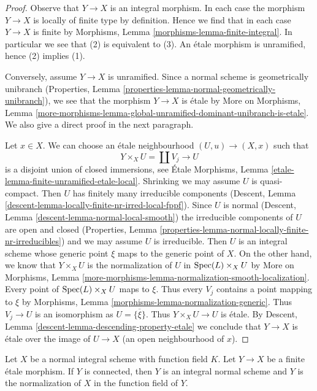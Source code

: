 \begin{proof}
Observe that $Y \to X$ is an integral morphism.
In each case the morphism $Y \to X$ is locally of finite type
by definition.
Hence we find that in each case $Y \to X$ is finite by
Morphisms, Lemma \ref{morphisms-lemma-finite-integral}.
In particular we see that (2) is equivalent to (3).
An \'etale morphism is unramified, hence (2) implies (1).

\medskip\noindent
Conversely, assume $Y \to X$ is unramified. Since a normal scheme is
geometrically unibranch
(Properties, Lemma \ref{properties-lemma-normal-geometrically-unibranch}),
we see that the morphism $Y \to X$ is \'etale by More on Morphisms, Lemma
\ref{more-morphisms-lemma-global-unramified-dominant-unibranch-is-etale}.
We also give a direct proof in the next paragraph.

\medskip\noindent
Let $x \in X$.
We can choose an \'etale neighbourhood $(U, u) \to (X, x)$ such that
$$
Y \times_X U = \coprod V_j \longrightarrow U
$$
is a disjoint union of closed immersions, see
\'Etale Morphisms, Lemma \ref{etale-lemma-finite-unramified-etale-local}.
Shrinking we may assume $U$ is quasi-compact.
Then $U$ has finitely many irreducible components
(Descent, Lemma \ref{descent-lemma-locally-finite-nr-irred-local-fppf}).
Since $U$ is normal
(Descent, Lemma \ref{descent-lemma-normal-local-smooth}) the
irreducible components of $U$ are open and closed
(Properties, Lemma \ref{properties-lemma-normal-locally-finite-nr-irreducibles})
and we may assume $U$ is irreducible. Then $U$ is an integral
scheme whose generic point $\xi$ maps to the generic point of $X$.
On the other hand, we know that $Y \times_X U$
is the normalization of $U$ in $\mathop{\mathrm{Spec}}(L) \times_X U$
by More on Morphisms, Lemma
\ref{more-morphisms-lemma-normalization-smooth-localization}.
Every point of $\mathop{\mathrm{Spec}}(L) \times_X U$ maps to $\xi$.
Thus every $V_j$ contains a point mapping to $\xi$ by
Morphisms, Lemma \ref{morphisms-lemma-normalization-generic}.
Thus $V_j \to U$ is an isomorphism as $U = \overline{\{\xi\}}$.
Thus $Y \times_X U \to U$ is \'etale. By
Descent, Lemma \ref{descent-lemma-descending-property-etale}
we conclude that $Y \to X$ is \'etale over the
image of $U \to X$ (an open neighbourhood of $x$).
\end{proof}

\begin{lemma}
\label{lemma-finite-etale-covering-normal-unramified}
Let $X$ be a normal integral scheme with function field $K$.
Let $Y \to X$ be a finite \'etale morphism. If $Y$ is connected,
then $Y$ is an integral normal scheme and $Y$ is the normalization
of $X$ in the function field of $Y$.
\end{lemma}

